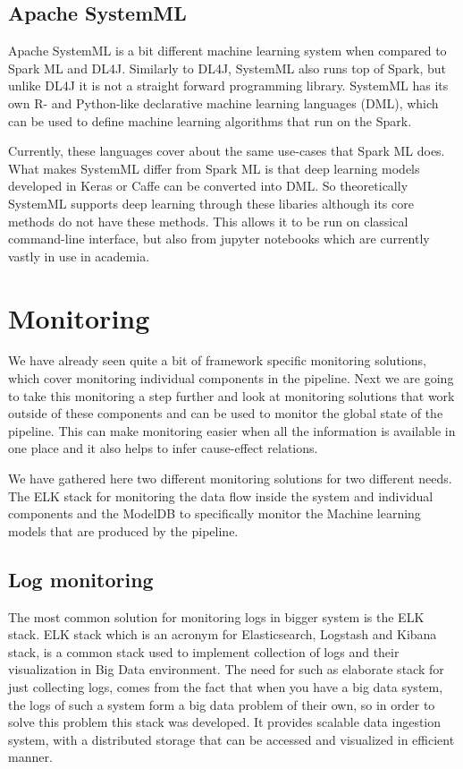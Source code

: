\subsection{Apache SystemML}

Apache SystemML is a bit different machine learning system when compared to Spark ML and DL4J.
Similarly to DL4J, SystemML also runs top of Spark, but unlike DL4J it is not a straight forward programming library.
SystemML has its own R- and Python-like declarative machine learning languages (DML), which can be used to define machine learning algorithms that run on the Spark. \cite{systemml}

Currently, these languages cover about the same use-cases that Spark ML does.
What makes SystemML differ from Spark ML is that deep learning models developed in Keras or Caffe can be converted into DML.
So theoretically SystemML supports deep learning through these libaries although its core methods do not have these methods.
This allows it to be run on classical command-line interface, but also from jupyter notebooks which are currently vastly in use in academia. \cite{systemml}

\section{Monitoring}

We have already seen quite a bit of framework specific monitoring solutions, which cover monitoring individual components in the pipeline.
Next we are going to take this monitoring a step further and look at monitoring solutions that work outside of these components and can be used to monitor the global state of the pipeline.
This can make monitoring easier when all the information is available in one place and it also helps to infer cause-effect relations.

We have gathered here two different monitoring solutions for two different needs.
The ELK stack for monitoring the data flow inside the system and individual components and the ModelDB to specifically monitor the Machine learning models that are produced by the pipeline.

\subsection{Log monitoring}

The most common solution for monitoring logs in bigger system is the ELK stack. 
ELK stack which is an acronym for Elasticsearch, Logstash and Kibana stack, is a common stack used to implement collection of logs and their visualization in Big Data environment.
The need for such as elaborate stack for just collecting logs, comes from the fact that when you have a big data system, the logs of such a system form a big data problem of their own, so in order to solve this problem this stack was developed.
It provides scalable data ingestion system, with a distributed storage that can be accessed and visualized in efficient manner. \cite{elastic}

